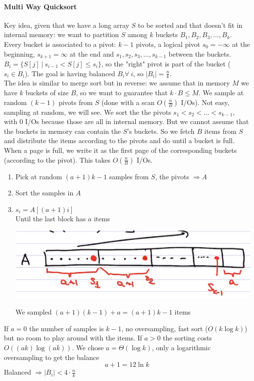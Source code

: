 \documentclass[10pt]{report}
\begin{document}
\paragraph{Multi Way Quicksort} Key idea, given that we have a long array $S$ to be sorted and that doesn't fit in internal memory: we want to partition $S$ among $k$ buckets $B_1,B_2,B_3,\ldots,B_k$. Every bucket is associated to a pivot: $k-1$ pivots, a logical pivot $s_0 = -\infty$ at the beginning, $s_{k+1} = \infty$ at the end and $s_1,s_2,s_3,\ldots,s_{k-1}$ between the buckets.\\
$B_i=\{S[j]\:|\: s_{i-1} < S[j] \leq s_i\}$, so the "right" pivot is part of the bucket ($s_i \in B_i$). The goal is having balanced $B_i \forall\:i$, so $|B_i| = \frac{n}{k}$.\\
The idea is similar to merge sort but in reverse: we assume that in memory $M$ we have $k$ buckets of size $B$, so we want to guarantee that $k\cdot B \leq M$. We sample at random $(k-1)$ pivots from $S$ (done with a scan $O(\frac{n}{B})$ I/Os). Not easy, sampling at random, we will see. We sort the the pivots $s_1 < s_2 < \ldots < s_{k-1}$, with 0 I/Os because those are all in internal memory. But we cannot assume that the buckets in memory can contain the $S$'s buckets. So we fetch $B$ items from $S$ and distribute the items according to the pivots and do until a bucket is full. When a page is full, we write it as the first page of the corresponding buckets (according to the pivot). This takes $O(\frac{n}{B})$ I/Os.
\begin{enumerate}
	\item Pick at random $(a + 1)k - 1$ samples from $S$, the pivots $\Rightarrow A$
	\item Sort the samples in $A$
	\item $s_i = A[(a+1)i]$\\
	Until the last block has $a$ items
	\begin{center}
		\includegraphics[scale=0.5]{3.png}
	\end{center}
	We sampled $(a+1)(k-1) + a = (a+1)k -1$ items
\end{enumerate}
If $a = 0$ the number of samples is $k-1$, no oversampling, fast sort ($O(k\log k)$) but no room to play around with the items. If $a > 0$ the sorting costs $O((ak)\log (ak))$. We chose $a = \Theta(\log k)$, only a logarithmic oversampling to get the balance $$a + 1 = 12\ln k$$ Balanced $\Rightarrow |B_i| < 4\cdot\frac{n}{k}$
\end{document}

